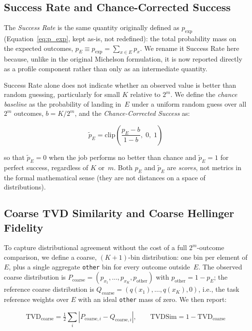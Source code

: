\subsection{Success Rate and Chance-Corrected Success}

The \emph{Success Rate} is the same quantity originally defined as $p_{\text{exp}}$ (Equation~\eqref{eq:p_exp}, kept as-is, not redefined): the total probability mass on the expected outcomes, $p_E \equiv p_{\text{exp}} = \sum_{x \in E} p_x$. We rename it Success Rate here because, unlike in the original Michelson formulation, it is now reported directly as a profile component rather than only as an intermediate quantity.

Success Rate alone does not indicate whether an observed value is better than random guessing, particularly for small $K$ relative to $2^m$. We define the \emph{chance baseline} as the probability of landing in~$E$ under a uniform random guess over all $2^m$ outcomes, $b = K/2^m$, and the \emph{Chance-Corrected Success} as:

\begin{equation}
\label{eq:profile_chance_corrected}
    \tilde{p}_E = \mathrm{clip}\!\left(\frac{p_E - b}{1 - b},\; 0,\; 1\right)
\end{equation}

so that $\tilde{p}_E = 0$ when the job performs no better than chance and $\tilde{p}_E = 1$ for perfect success, regardless of $K$ or~$m$. Both $p_E$ and $\tilde{p}_E$ are \emph{scores}, not metrics in the formal mathematical sense (they are not distances on a space of distributions).

\subsection{Coarse TVD Similarity and Coarse Hellinger Fidelity}

To capture distributional agreement without the cost of a full $2^m$-outcome comparison, we define a coarse, $(K{+}1)$-bin distribution: one bin per element of $E$, plus a single aggregate \texttt{other} bin for every outcome outside~$E$. The observed coarse distribution is $P_{\text{coarse}} = (p_{x_1}, \ldots, p_{x_K}, p_{\text{other}})$ with $p_{\text{other}} = 1 - p_E$; the reference coarse distribution is $Q_{\text{coarse}} = (q(x_1), \ldots, q(x_K), 0)$, i.e., the task reference weights over $E$ with an ideal \texttt{other} mass of zero. We then report:

\begin{equation}
\label{eq:profile_coarse_tvd}
    \mathrm{TVD}_{\text{coarse}} = \tfrac{1}{2}\sum_{i} \left| P_{\text{coarse}, i} - Q_{\text{coarse}, i} \right|, \qquad
    \mathrm{TVDSim} = 1 - \mathrm{TVD}_{\text{coarse}}
\end{equation}

